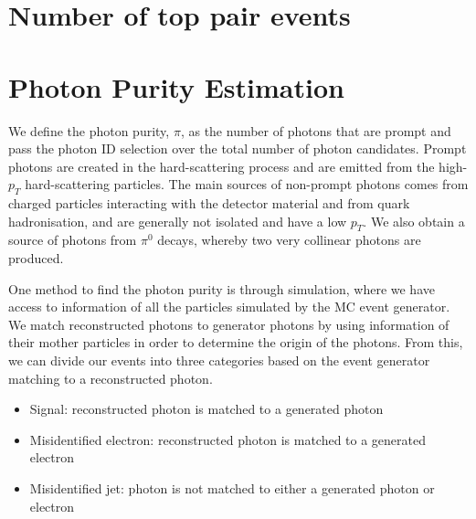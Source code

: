 \section{Number of top pair events}



\section{Photon Purity Estimation} \label{sec-PhotonPurityEstimation}

We define the photon purity, $\pi$, as the number of photons that are prompt and pass the photon ID selection over the total number of photon candidates. Prompt photons are created in the hard-scattering process and are emitted from the high-$p_T$ hard-scattering particles. The main sources of non-prompt photons comes from charged particles interacting with the detector material and from quark hadronisation, and are generally not isolated and have a low $p_T$. We also obtain a source of photons from $\pi^0$ decays, whereby two very collinear photons are produced. 

One method to find the photon purity is through simulation, where we have access to information of all the particles simulated by the MC event generator. We match reconstructed photons to generator photons by using information of their mother particles in order to determine the origin of the photons. From this, we can divide our events into three categories based on the event generator matching to a reconstructed photon. 

\begin{itemize}
	\item Signal: reconstructed photon is matched to a generated photon
	\item Misidentified electron: reconstructed photon is matched to a generated electron
	\item Misidentified jet: photon is not matched to either a generated photon or electron
\end{itemize}

